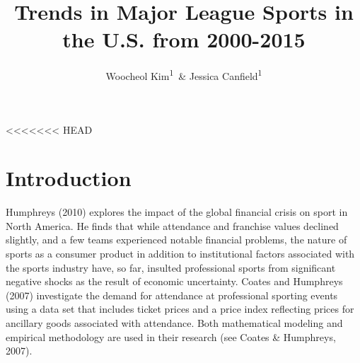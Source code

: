 \documentclass[man, fleqn, noextraspace,floatsintext]{apa6}
\title{Trends in Major League Sports in the U.S. from 2000-2015}
\author{Woocheol Kim\textsuperscript{1}~\& Jessica Canfield\textsuperscript{1}}
\date{}
\affiliation{
\vspace{0.5cm}
\textsuperscript{1} University of Oregon}
\begin{document}
\maketitle

<<<<<<< HEAD
\section{Introduction}\label{introduction}

Humphreys (2010) explores the impact of the global financial crisis on
sport in North America. He finds that while attendance and franchise
values declined slightly, and a few teams experienced notable financial
problems, the nature of sports as a consumer product in addition to
institutional factors associated with the sports industry have, so far,
insulted professional sports from significant negative shocks as the
result of economic uncertainty. Coates and Humphreys (2007) investigate
the demand for attendance at professional sporting events using a data
set that includes ticket prices and a price index reflecting prices for
ancillary goods associated with attendance. Both mathematical modeling
and empirical methodology are used in their research (see Coates \&
Humphreys, 2007).
\end{document}
